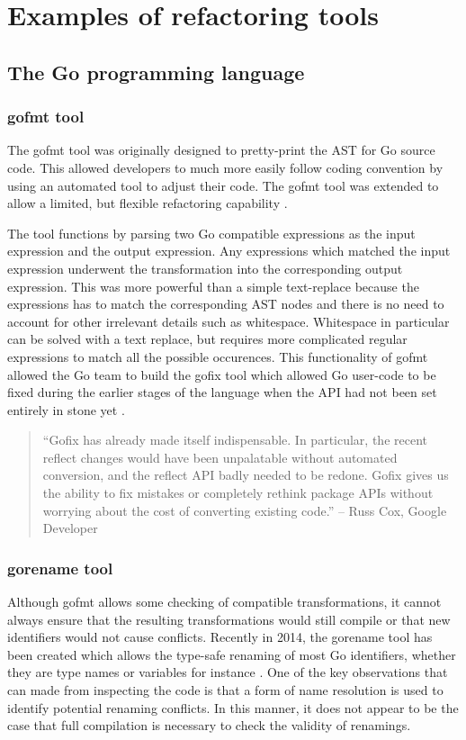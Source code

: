 \section{Examples of refactoring tools}\label{S:exback}
\subsection{The Go programming language}
\subsubsection{gofmt tool}
The gofmt tool was originally designed to pretty-print the AST for Go source code. This allowed developers to much more easily follow coding convention by using an automated tool to adjust their code. The gofmt tool was extended to allow a limited, but flexible refactoring capability \cite{gofmt15}. 

The tool functions by parsing two Go compatible expressions as the input expression and the output expression. Any expressions which matched the input expression underwent the transformation into the corresponding output expression. This was more powerful than a simple text-replace because the expressions has to match the corresponding AST nodes and there is no need to account for other irrelevant details such as whitespace. Whitespace in particular can be solved with a text replace, but requires more complicated regular expressions to match all the possible occurences. This functionality of gofmt allowed the Go team to build the gofix tool which allowed Go user-code to be fixed during the earlier stages of the language when the API had not been set entirely in stone yet \cite{gofix11}.

\begin{quote}
``Gofix has already made itself indispensable. In particular, the recent reflect changes would have been unpalatable without automated conversion, and the reflect API badly needed to be redone. Gofix gives us the ability to fix mistakes or completely rethink package APIs without worrying about the cost of converting existing code.'' -- Russ Cox, Google Developer \cite{gofix11}
\end{quote}



\subsubsection{gorename tool}
Although gofmt allows some checking of compatible transformations, it cannot always ensure that the resulting transformations would still compile or that new identifiers would not cause conflicts. Recently in 2014, the gorename tool has been created which allows the type-safe renaming of most Go identifiers, whether they are type names or variables for instance \cite{gorename15}. One of the key observations that can made from inspecting the code is that a form of name resolution is used to identify potential renaming conflicts. In this manner, it does not appear to be the case that full compilation is necessary to check the validity of renamings.

